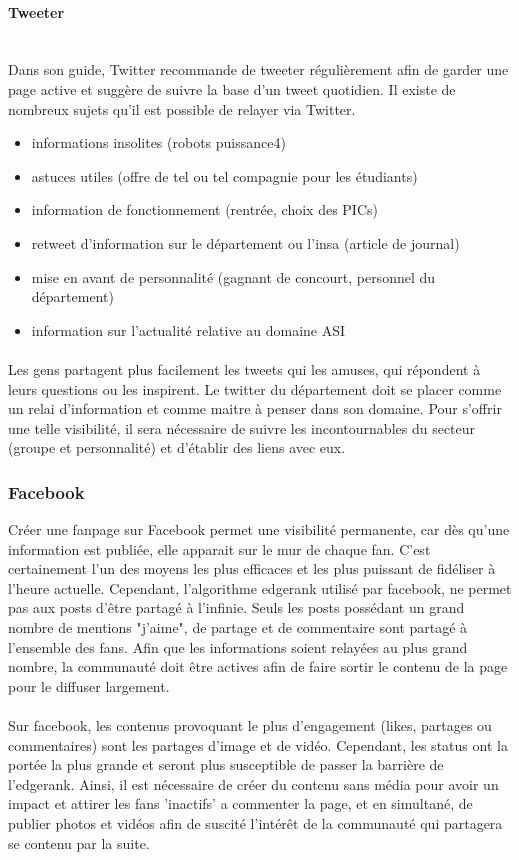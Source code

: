 \paragraph{Tweeter} ~~\\
Dans son guide, Twitter recommande de tweeter régulièrement afin de garder une page active et suggère de suivre la base d'un tweet quotidien.
Il existe de nombreux sujets qu'il est possible de relayer via Twitter.
\begin{itemize}
	\item informations insolites (robots puissance4)
	\item astuces utiles (offre de tel ou tel compagnie pour les étudiants)
	\item information de fonctionnement (rentrée, choix des PICs)
	\item retweet d'information sur le département ou l'insa (article de journal)
	\item mise en avant de personnalité (gagnant de concourt, personnel du département)
	\item information sur l'actualité relative au domaine ASI
\end{itemize}
\paragraph{}
 Les gens partagent plus facilement les tweets qui les amuses, qui répondent à leurs questions ou les inspirent. Le twitter du département doit se placer comme un relai d'information et comme maitre à penser dans son domaine. Pour s'offrir une telle visibilité, il sera nécessaire de suivre les incontournables du secteur (groupe et personnalité) et d'établir des liens avec eux.
\subsubsection{Facebook}
Créer une fanpage sur Facebook permet une visibilité permanente, car dès qu'une information est publiée, elle apparait sur le mur de chaque fan. C'est certainement l'un des moyens les plus efficaces et les plus puissant de fidéliser à l'heure actuelle. Cependant, l'algorithme edgerank utilisé par facebook, ne permet pas aux posts d'être partagé à l'infinie. Seuls les posts possédant un grand nombre de mentions "j'aime", de partage et de commentaire sont partagé à l'ensemble des fans. Afin que les informations soient relayées au plus grand nombre, la communauté doit être actives afin de faire sortir le contenu de la page pour le diffuser largement.
\paragraph{}
Sur facebook, les contenus provoquant le plus d'engagement (likes, partages ou commentaires) sont les partages d'image et de vidéo. Cependant, les status ont la portée la plus grande et seront plus susceptible de passer la barrière de l'edgerank. Ainsi, il est nécessaire de créer du contenu sans média pour avoir un impact et attirer les fans 'inactifs' a commenter la page, et en simultané, de publier photos et vidéos afin de suscité l'intérêt de la communauté qui partagera se contenu par la suite.